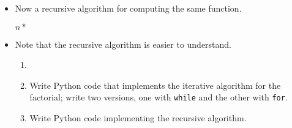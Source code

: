 \documentclass[a4paper]{article}
\begin{document}
{\begin{itemize}
\begin{ucodeframe}
\vspace{1em}
\begin{algorithmic}
\State $result \gets 1$
\State $count \gets 0$
		\State $count \gets count + 1$
		\State $result \gets result \times count$
	\EndWhile
\State \Return $result$
\EndFunction
\end{algorithmic}
\end{ucodeframe}

\item Now a recursive algorithm for computing the same function.

\begin{ucodeframe}
\vspace{1em}
\begin{algorithmic}
\State {}
\Else
\State \Return $n*$ 
\EndIf
\EndFunction
\end{algorithmic}

\end{ucodeframe}
\item Note that the recursive algorithm is easier to understand. 

\begin{uexercise}
\begin{enumerate}
\item[]
\item Write Python code that implements the iterative algorithm for
the factorial; write two versions, one with \Verb+while+ and the other with
\Verb+for+.

\begin{hide}
\begin{usolution}
\begin{ucodeframe}
\end{ucodeframe}

\begin{ucodeframe}
\end{ucodeframe}
\end{usolution}
\end{hide}

\item Write Python code implementing the recursive algorithm.
\begin{hide}
\begin{usolution}
\begin{ucodeframe}
\end{ucodeframe}
\end{usolution}
\end{hide}
\end{enumerate}
\end{uexercise}



\end{itemize}}
\end{document}
